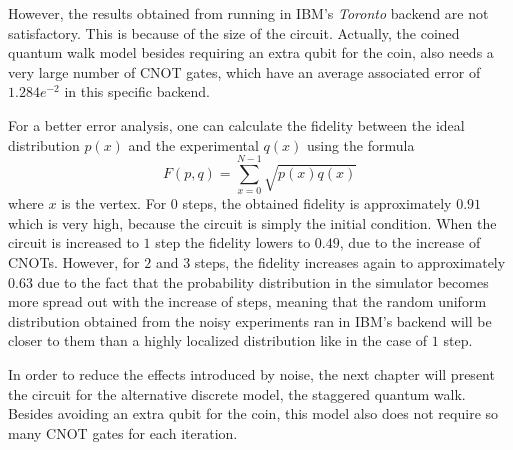 \documentclass[../../dissertation.tex]{subfiles}
\begin{document}
However, the results obtained from running in IBM's \textit{Toronto} backend
are not satisfactory. This is because of the size of the circuit. Actually, the coined
quantum walk model besides requiring an extra qubit for the coin, also needs a
very large number of CNOT gates, which have an average associated error of
$1.284e^{-2}$ in this specific backend.\par

For a better error analysis, one can calculate the fidelity between the
ideal distribution $p(x)$ and the experimental $q(x)$ using the formula
\begin{equation}
    F(p,q) = \sum_{x=0}^{N-1} \sqrt{p(x)q(x)}
    \label{eq:bestFid}
\end{equation}
where $x$ is the vertex. For $0$ steps, the obtained fidelity is approximately
$0.91$ which is very high, because the circuit is simply the initial condition. When the circuit is increased to $1$ step the fidelity lowers to $0.49$,
due to the increase of CNOTs. However, for $2$ and $3$ steps, the fidelity
increases again to approximately $0.63$ due to the fact that the probability
distribution in the simulator becomes more spread out with the increase of
steps, meaning that the random uniform distribution obtained from the noisy
experiments ran in IBM's backend will be closer to them than a highly localized
distribution like in the case of $1$ step.\par

In order to reduce the effects introduced by noise, the next chapter will
present the circuit for the alternative discrete model, the staggered quantum
walk. Besides avoiding an extra qubit for the coin, this model also does not
require so many CNOT gates for each iteration.
\end{document}
